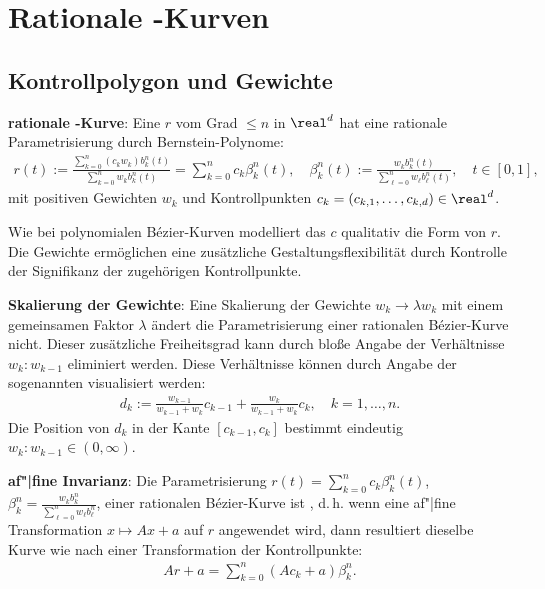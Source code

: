 \section{%
    Rationale -Kurven%
}

\subsection{%
    Kontrollpolygon und Gewichte%
}

\textbf{rationale -Kurve}:
Eine  $r$ vom Grad $\le n$ in $\real^d$ hat eine
rationale Parametrisierung durch Bernstein-Polynome:
\begin{align*}
    r(t) := \frac{\sum_{k=0}^n (c_k w_k) b_k^n(t)}{\sum_{k=0}^n w_k b_k^n(t)}
    =\sum_{k=0}^n c_k \beta_k^n(t),\quad
    \beta_k^n(t) := \frac{w_k b_k^n(t)}{\sum_{\ell=0}^n w_\ell b_\ell^n(t)},\quad t \in [0, 1],
\end{align*}
mit positiven Gewichten $w_k$ und Kontrollpunkten $c_k = (c_{k,1}, \dotsc, c_{k,d}) \in \real^d$.

Wie bei polynomialen Bézier-Kurven modelliert das  $c$ qualitativ
die Form von $r$.
Die Gewichte ermöglichen eine zusätzliche Gestaltungsflexibilität durch
Kontrolle der Signifikanz der zugehörigen Kontrollpunkte.

\linie

\textbf{Skalierung der Gewichte}:
Eine Skalierung der Gewichte $w_k \rightarrow \lambda w_k$ mit einem gemeinsamen Faktor $\lambda$
ändert die Parametrisierung einer rationalen Bézier-Kurve nicht.
Dieser zusätzliche Freiheitsgrad kann durch bloße Angabe der Verhältnisse $w_k : w_{k-1}$
eliminiert werden.
Diese Verhältnisse können durch Angabe der sogenannten 
visualisiert werden:
\begin{align*}
    d_k := \frac{w_{k-1}}{w_{k-1} + w_k} c_{k-1} + \frac{w_k}{w_{k-1} + w_k} c_k,\quad
    k = 1, \dotsc, n.
\end{align*}
Die Position von $d_k$ in der Kante $[c_{k-1}, c_k]$ bestimmt eindeutig
$w_k : w_{k-1} \in (0, \infty)$.

\linie

\textbf{af"|fine Invarianz}:
Die Parametrisierung
$r(t) = \sum_{k=0}^n c_k \beta_k^n(t)$,
$\beta_k^n = \frac{w_k b_k^n}{\sum_{\ell=0}^n w_\ell b_\ell^n}$,
einer rationalen Bézier-Kurve ist , d.\,h. wenn eine af"|fine
Transformation
$x \mapsto Ax + a$
auf $r$ angewendet wird, dann resultiert dieselbe Kurve wie nach einer Transformation der
Kontrollpunkte:
\begin{align*}
    Ar + a = \sum_{k=0}^n (Ac_k + a) \beta_k^n.
\end{align*}


